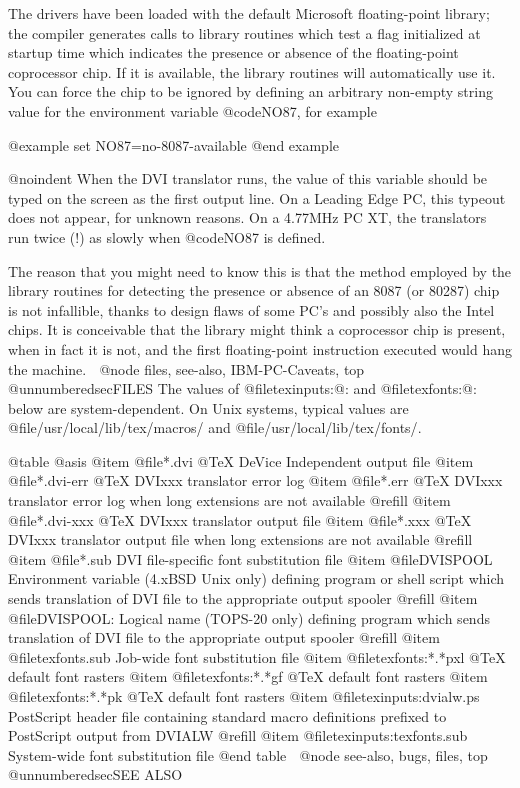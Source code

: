 {The drivers have been loaded with the default Microsoft
floating-point library; the compiler generates calls to library
routines which test a flag initialized at startup time which
indicates the presence or absence of the floating-point
coprocessor chip.  If it is available, the library routines will
automatically use it.  You can force the chip to be ignored by
defining an arbitrary non-empty string value for the environment
variable @code{NO87}, for example

@example
set NO87=no-8087-available
@end example

@noindent
When the DVI translator runs, the value of this variable should
be typed on the screen as the first output line.  On a Leading
Edge PC, this typeout does not appear, for unknown reasons.  On
a 4.77MHz PC XT, the translators run twice (!) as slowly when
@code{NO87} is defined.

The reason that you might need to know this is that the method
employed by the library routines for detecting the presence or
absence of an 8087 (or 80287) chip is not infallible, thanks to
design flaws of some PC's and possibly also the Intel chips.  It
is conceivable that the library might think a coprocessor chip is
present, when in fact it is not, and the first floating-point
instruction executed would hang the machine.

@node files, see-also, IBM-PC-Caveats, top
@unnumberedsec{FILES}
The values of @file{texinputs:}@: and @file{texfonts:}@: below are
system-dependent.  On Unix systems, typical values are
@file{/usr/local/lib/tex/macros/} and
@file{/usr/local/lib/tex/fonts/}.

@table @asis
@item @file{*.dvi}
@TeX{} DeVice Independent output file
@item @file{*.dvi-err}
@TeX{} DVIxxx translator error log
@item @file{*.err}
@TeX{} DVIxxx translator error log when long extensions are
not available @refill
@item @file{*.dvi-xxx}
@TeX{} DVIxxx translator output file
@item @file{*.xxx}
@TeX{} DVIxxx translator output file when long extensions are
not available @refill
@item @file{*.sub}
DVI file-specific font substitution file
@item @file{DVISPOOL}
Environment variable (4.xBSD Unix only) defining program or
shell script which sends translation of DVI file to the
appropriate output spooler @refill
@item @file{DVISPOOL:}
Logical name (TOPS-20 only) defining program which sends
translation of DVI file to the appropriate output spooler @refill
@item @file{texfonts.sub}
Job-wide font substitution file
@item @file{texfonts:*.*pxl}
@TeX{} default font rasters
@item @file{texfonts:*.*gf}
@TeX{} default font rasters
@item @file{texfonts:*.*pk}
@TeX{} default font rasters
@item @file{texinputs:dvialw.ps}
PostScript header file containing standard macro
definitions prefixed to PostScript output from DVIALW @refill
@item @file{texinputs:texfonts.sub}
System-wide font substitution file
@end table

@node see-also, bugs, files, top
@unnumberedsec{SEE ALSO}

}

